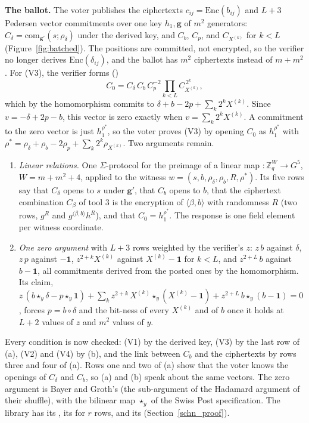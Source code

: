 \textbf{The ballot.} The voter publishes the ciphertexts $c_{ij} =
\mathrm{Enc}(b_{ij})$ and $L + 3$ Pedersen vector commitments over one
key $h_1, \mathbf{g}$ of $m^2$ generators: $C_\delta =
\mathrm{com}_{\mathbf{g}'}(s; \rho_\delta)$ under the derived key, and
$C_b$, $C_p$, and $C_{X^{(k)}}$ for $k < L$ (Figure~\ref{fig:batched}).
The positions are committed, not encrypted, so the verifier no longer
derives $\mathrm{Enc}(\delta_{ij})$, and the ballot has $m^2$
ciphertexts instead of $m + m^2$. For (V3), the verifier forms
()
\[
  C_0 = C_\delta\, C_b\, C_p^{-2} \prod_{k<L} C_{X^{(k)}}^{\,2^k},
\]
which by the homomorphism commits to $\delta + b - 2p + \sum_k 2^k
X^{(k)}$. Since $v = -\delta + 2p - b$, this vector is zero exactly when
$v = \sum_k 2^k X^{(k)}$. A commitment to the zero vector is just
$h_1^{\rho^*}$, so the voter proves (V3) by opening $C_0$ as
$h_1^{\rho^*}$ with $\rho^* = \rho_\delta + \rho_b - 2\rho_p + \sum_k
2^k \rho_{X^{(k)}}$. Two arguments remain.
\begin{enumerate}
  \item[(a)] \emph{Linear relations.} One $\Sigma$-protocol for the
  preimage of a linear map  $: \mathbb{Z}_q^W \to G^5$, $W = m +
  m^2 + 4$, applied to the witness $w = (s, b, \rho_\delta, \rho_b, R,
  \rho^*)$. Its five rows say that $C_\delta$ opens to $s$ under
  $\mathbf{g}'$, that $C_b$ opens to $b$, that the ciphertext
  combination $C_\beta$ of tool 3 is the
  encryption of $\langle \beta, b \rangle$ with randomness $R$ (two rows,
  $g^R$ and $g^{\langle\beta,b\rangle} h^R$), and that $C_0 =
  h_1^{\rho^*}$. The response is one field element per witness
  coordinate.
  \item[(b)] \emph{One zero argument} with $L + 3$ rows weighted by the
  verifier's $z$: $z\,b$ against $\delta$, $z\,p$ against $-\mathbf{1}$,
  $z^{2+k} X^{(k)}$ against $X^{(k)} - \mathbf{1}$ for $k < L$, and
  $z^{2+L}\, b$ against $b - \mathbf{1}$, all commitments derived from the
  posted ones by the homomorphism. Its claim, $z\,(b \star_y \delta - p
  \star_y \mathbf{1}) + \sum_k z^{2+k}\, X^{(k)} \star_y (X^{(k)} -
  \mathbf{1}) + z^{2+L}\, b \star_y (b - \mathbf{1}) = 0$, forces $p = b
  \circ \delta$ and the bit-ness of every $X^{(k)}$ and of $b$ once it
  holds at $L + 2$ values of $z$ and $m^2$ values of $y$.
\end{enumerate}
Every condition is now checked: (V1) by the derived key, (V3) by the
last row of (a), (V2) and (V4) by (b), and the link between $C_b$ and
the ciphertexts by rows three and four of (a). Rows one and two of (a)
show that the voter knows the openings of $C_\delta$ and $C_b$, so (a)
and (b) speak about the same vectors. The zero argument is Bayer and
Groth's (the sub-argument of the Hadamard argument of their shuffle),
with the bilinear map $\star_y$ of the Swiss Post specification. The
library has its , its
 for $r$ rows, and its  (Section~\ref{schn_proof}).

